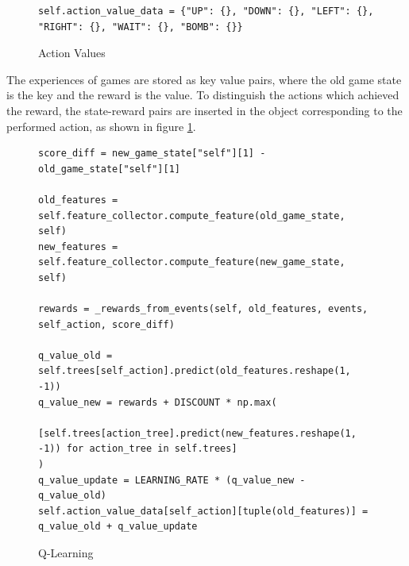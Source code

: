 \documentclass{article}
\begin{document}
\begin{figure}[h]
\centering
\begin{verbatim}
self.action_value_data = {"UP": {}, "DOWN": {}, "LEFT": {}, "RIGHT": {}, "WAIT": {}, "BOMB": {}}
\end{verbatim}
\caption{Action Values}
\label{code:action_values}
\end{figure}

The experiences of games are stored as key value pairs, where the old game state is the key and the reward is the value. To distinguish the actions which achieved the reward, the state-reward pairs are inserted in the object corresponding to the performed action, as shown in figure \ref{code:action_values}.

\begin{figure}[h]
\centering
\begin{verbatim}
score_diff = new_game_state["self"][1] - old_game_state["self"][1]

old_features = self.feature_collector.compute_feature(old_game_state, self)
new_features = self.feature_collector.compute_feature(new_game_state, self)

rewards = _rewards_from_events(self, old_features, events, self_action, score_diff)

q_value_old = self.trees[self_action].predict(old_features.reshape(1, -1))
q_value_new = rewards + DISCOUNT * np.max(
    [self.trees[action_tree].predict(new_features.reshape(1, -1)) for action_tree in self.trees]
)
q_value_update = LEARNING_RATE * (q_value_new - q_value_old)
self.action_value_data[self_action][tuple(old_features)] = q_value_old + q_value_update
\end{verbatim}
\caption{Q-Learning}
\label{code:temporal_difference}
\end{figure}
\end{document}
